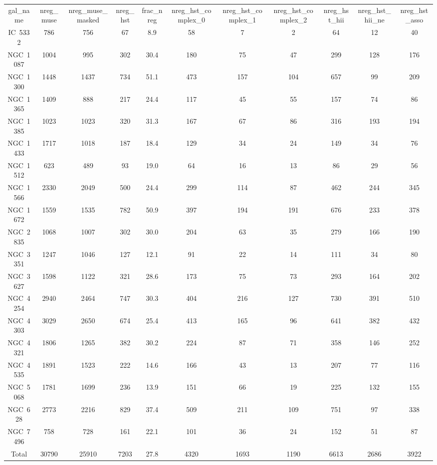 \begin{table}
\begin{tabular}{ccccccccccc}
gal_name & nreg_muse & nreg_muse_masked & nreg_hst & frac_nreg & nreg_hst_complex_0 & nreg_hst_complex_1 & nreg_hst_complex_2 & nreg_hst_hii & nreg_hst_hii_ne & nreg_hst_asso \\
IC~5332 & 786 & 756 & 67 & 8.9 & 58 & 7 & 2 & 64 & 12 & 40 \\
NGC~1087 & 1004 & 995 & 302 & 30.4 & 180 & 75 & 47 & 299 & 128 & 176 \\
NGC~1300 & 1448 & 1437 & 734 & 51.1 & 473 & 157 & 104 & 657 & 99 & 209 \\
NGC~1365 & 1409 & 888 & 217 & 24.4 & 117 & 45 & 55 & 157 & 74 & 86 \\
NGC~1385 & 1023 & 1023 & 320 & 31.3 & 167 & 67 & 86 & 316 & 193 & 194 \\
NGC~1433 & 1717 & 1018 & 187 & 18.4 & 129 & 34 & 24 & 149 & 34 & 76 \\
NGC~1512 & 623 & 489 & 93 & 19.0 & 64 & 16 & 13 & 86 & 29 & 56 \\
NGC~1566 & 2330 & 2049 & 500 & 24.4 & 299 & 114 & 87 & 462 & 244 & 345 \\
NGC~1672 & 1559 & 1535 & 782 & 50.9 & 397 & 194 & 191 & 676 & 233 & 378 \\
NGC~2835 & 1068 & 1007 & 302 & 30.0 & 204 & 63 & 35 & 279 & 166 & 190 \\
NGC~3351 & 1247 & 1046 & 127 & 12.1 & 91 & 22 & 14 & 111 & 34 & 80 \\
NGC~3627 & 1598 & 1122 & 321 & 28.6 & 173 & 75 & 73 & 293 & 164 & 202 \\
NGC~4254 & 2940 & 2464 & 747 & 30.3 & 404 & 216 & 127 & 730 & 391 & 510 \\
NGC~4303 & 3029 & 2650 & 674 & 25.4 & 413 & 165 & 96 & 641 & 382 & 432 \\
NGC~4321 & 1806 & 1265 & 382 & 30.2 & 224 & 87 & 71 & 358 & 146 & 252 \\
NGC~4535 & 1891 & 1523 & 222 & 14.6 & 166 & 43 & 13 & 207 & 77 & 116 \\
NGC~5068 & 1781 & 1699 & 236 & 13.9 & 151 & 66 & 19 & 225 & 132 & 155 \\
NGC~628 & 2773 & 2216 & 829 & 37.4 & 509 & 211 & 109 & 751 & 97 & 338 \\
NGC~7496 & 758 & 728 & 161 & 22.1 & 101 & 36 & 24 & 152 & 51 & 87 \\
Total & 30790 & 25910 & 7203 & 27.8 & 4320 & 1693 & 1190 & 6613 & 2686 & 3922 \\
\end{tabular}
\end{table}
